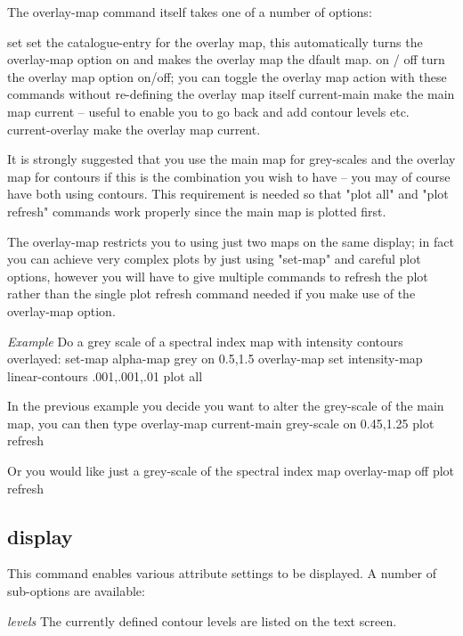 The overlay-map command itself takes one of a number of options:

   set                set the catalogue-entry for the overlay map, this
                      automatically turns the overlay-map option on and
                      makes the overlay map the dfault map.
   on / off           turn the overlay map option on/off; you can toggle the
                      overlay map action with these commands without
                      re-defining the overlay map itself
   current-main       make the main map current -- useful to enable you
                      to go back and add contour levels etc.
   current-overlay    make the overlay map current.

It is strongly suggested that you use the main map for grey-scales
and the overlay map for contours if this is the combination you wish to
have -- you may of course have both using contours.  This requirement
is needed so that "plot all" and "plot refresh" commands work properly
since the main map is plotted first.

The overlay-map restricts you to using just two maps on the same display;
in fact you can achieve very complex plots by just using "set-map" and
careful plot options, however you will have to give multiple commands
to refresh the plot rather than the single plot refresh command needed if
you make use of the overlay-map option.

{\em Example}
\newline
Do a grey scale of a spectral index map with intensity contours
overlayed:
  set-map alpha-map
  grey on 0.5,1.5
  overlay-map set intensity-map
  linear-contours .001,.001,.01
  plot all

In the previous example you decide you want to alter the grey-scale
of the main map, you can then type
  overlay-map current-main
  grey-scale on 0.45,1.25
  plot refresh

Or you would like just a grey-scale of the spectral index map
  overlay-map off
  plot refresh



\subsection{display}

This command enables various attribute settings to be
displayed. A number of sub-options are available:

{\em levels}
\newline
The currently defined contour levels are listed on the text
screen.

